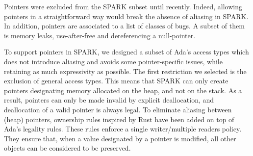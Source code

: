 \documentclass[runningheads]{llncs}
\begin{document}
Pointers were excluded from the SPARK subset until recently. Indeed, allowing pointers in a straightforward way would break the absence of aliasing in SPARK. In addition, pointers are associated to a list of classes of bugs. A subset of them is memory leaks, use-after-free and dereferencing a null-pointer.%

To support pointers in SPARK, we designed a subset of Ada's access types which does not introduce aliasing and avoids some pointer-specific issues, while retaining as much expressivity as possible. The first restriction we selected is the exclusion of general access types. This means that SPARK can only create pointers designating memory allocated on the heap, and not on the stack. As a result, pointers can only be made invalid by explicit deallocation, and deallocation of a valid pointer is always legal. %
To eliminate aliasing between (heap) pointers, ownership rules inspired by Rust have been added on top of Ada's legality rules. These rules enforce a single writer/multiple readers policy. They ensure that, when a value designated by a pointer is modified, all other objects can be considered to be preserved.
\end{document}
